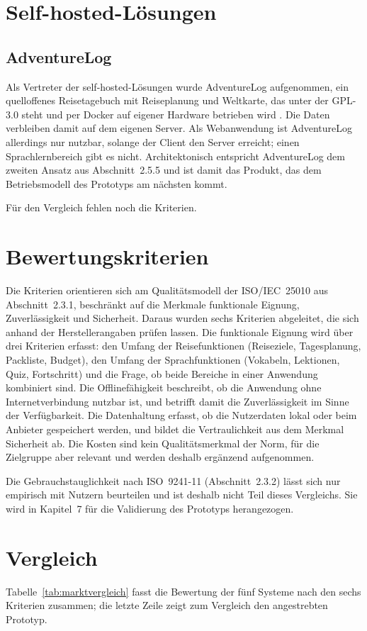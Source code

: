 \documentclass[12pt,a4paper]{scrreprt}
\begin{document}
\section{Self-hosted-Lösungen}

\subsection{AdventureLog}
Als Vertreter der self-hosted-Lösungen wurde AdventureLog aufgenommen, ein quelloffenes Reisetagebuch mit Reiseplanung und Weltkarte, das unter der GPL-3.0 steht und per Docker auf eigener Hardware betrieben wird \cite{adventurelog}. Die Daten verbleiben damit auf dem eigenen Server. Als Webanwendung ist AdventureLog allerdings nur nutzbar, solange der Client den Server erreicht; einen Sprachlernbereich gibt es nicht. Architektonisch entspricht AdventureLog dem zweiten Ansatz aus Abschnitt~2.5.5 und ist damit das Produkt, das dem Betriebsmodell des Prototyps am nächsten kommt.

Für den Vergleich fehlen noch die Kriterien.

\section{Bewertungskriterien}
Die Kriterien orientieren sich am Qualitätsmodell der ISO/IEC~25010 aus Abschnitt~2.3.1, beschränkt auf die Merkmale funktionale Eignung, Zuverlässigkeit und Sicherheit. Daraus wurden sechs Kriterien abgeleitet, die sich anhand der Herstellerangaben prüfen lassen. Die funktionale Eignung wird über drei Kriterien erfasst: den Umfang der Reisefunktionen (Reiseziele, Tagesplanung, Packliste, Budget), den Umfang der Sprachfunktionen (Vokabeln, Lektionen, Quiz, Fortschritt) und die Frage, ob beide Bereiche in einer Anwendung kombiniert sind. Die Offlinefähigkeit beschreibt, ob die Anwendung ohne Internetverbindung nutzbar ist, und betrifft damit die Zuverlässigkeit im Sinne der Verfügbarkeit. Die Datenhaltung erfasst, ob die Nutzerdaten lokal oder beim Anbieter gespeichert werden, und bildet die Vertraulichkeit aus dem Merkmal Sicherheit ab. Die Kosten sind kein Qualitätsmerkmal der Norm, für die Zielgruppe aber relevant und werden deshalb ergänzend aufgenommen.

Die Gebrauchstauglichkeit nach ISO~9241-11 (Abschnitt~2.3.2) lässt sich nur empirisch mit Nutzern beurteilen und ist deshalb nicht Teil dieses Vergleichs. Sie wird in Kapitel~7 für die Validierung des Prototyps herangezogen.

\section{Vergleich}
Tabelle~\ref{tab:marktvergleich} fasst die Bewertung der fünf Systeme nach den sechs Kriterien zusammen; die letzte Zeile zeigt zum Vergleich den angestrebten Prototyp.
\end{document}
